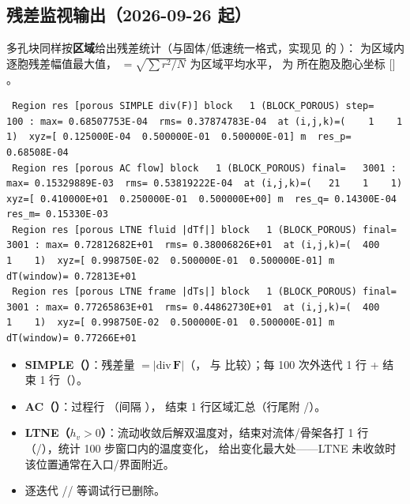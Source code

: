 \subsection{残差监视输出（2026-09-26 起）}
多孔块同样按\textbf{区域}给出残差统计（与固体/低速统一格式，实现见
 的 ）： 为区域内逐胞残差幅值最大值，
 $=\sqrt{\sum r^2/N}$ 为区域平均水平， 为  所在胞及胞心坐标 $[$$]$。
\begin{lstlisting}
 Region res [porous SIMPLE div(F)] block   1 (BLOCK_POROUS) step=    100 : max= 0.68507753E-04  rms= 0.37874783E-04  at (i,j,k)=(    1    1    1)  xyz=[ 0.125000E-04  0.500000E-01  0.500000E-01] m  res_p= 0.68508E-04
 Region res [porous AC flow] block   1 (BLOCK_POROUS) final=   3001 : max= 0.15329889E-03  rms= 0.53819222E-04  at (i,j,k)=(   21    1    1)  xyz=[ 0.410000E+01  0.250000E-01  0.500000E+00] m  res_q= 0.14300E-04 res_m= 0.15330E-03
 Region res [porous LTNE fluid |dTf|] block   1 (BLOCK_POROUS) final=  3001 : max= 0.72812682E+01  rms= 0.38006826E+01  at (i,j,k)=(  400    1    1)  xyz=[ 0.998750E-02  0.500000E-01  0.500000E-01] m  dT(window)= 0.72813E+01
 Region res [porous LTNE frame |dTs|] block   1 (BLOCK_POROUS) final=  3001 : max= 0.77265863E+01  rms= 0.44862730E+01  at (i,j,k)=(  400    1    1)  xyz=[ 0.998750E-02  0.500000E-01  0.500000E-01] m  dT(window)= 0.77266E+01
\end{lstlisting}
\begin{itemize}
  \item \textbf{SIMPLE（）}：残差量 $=\lvert\mathrm{div}\,\mathbf{F}\rvert$（，
        与  比较）；每 100 次外迭代 1 行 + 结束 1 行（）。
  \item \textbf{AC（）}：过程行 （间隔 ），
        结束 1 行区域汇总（行尾附 /）。
  \item \textbf{LTNE（$h_v>0$）}：流动收敛后解双温度对，结束对流体/骨架各打 1 行
        （/），统计 100 步窗口内的温度变化，
         给出变化最大处——LTNE 未收敛时该位置通常在入口/界面附近。
  \item 逐迭代 // 等调试行已删除。
\end{itemize}

